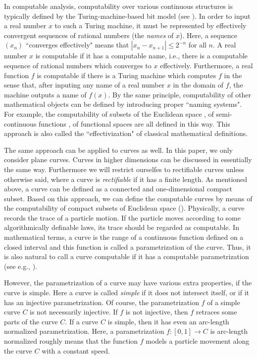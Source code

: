 \documentclass{LMCS}
\theoremstyle{plain}
\begin{document}
In computable analysis, computability over various continuous structures is typically defined by the Turing-machine-based bit model (see \cite{Ko91,Wei00,BC06}). In order to input a real number $x$ to such a Turing machine, it must be represented by effectively convergent sequences of rational numbers (the {\em names} of $x$). Here, a sequence $(x_n)$ ``converges effectively" means that $|x_n-x_{n+1}| \le 2^{-n}$ for all $n$. A real number $x$ is computable if it has a computable name, i.e., there is a computable sequence of rational numbers which converges to $x$ effectively. Furthermore, a real function $f$ is computable if there is a Turing machine which computes $f$ in the sense that, after inputing any name of a real number $x$ in the domain of $f$, the machine outputs a name of $f(x)$. By the same principle, computability of other mathematical objects can be defined by introducing proper ``naming systems". For example, the computability of subsets of the Euclidean space \cite{BW99}, of semi-continuous functions \cite{WZ97}, of functional spaces \cite{ZW03} are all defined in this way. This approach is also called the ``effectivization" of classical mathematical definitions.

The same approach can be applied to curves as well. In this paper, we only consider plane curves. Curves in higher dimensions can be discussed in essentially the same way. Furthermore we will restrict ourselfes to rectifiable curves unless otherwise said, where a curve is {\em rectifiable} if it has a finite length.
As mentioned above, a curve can be defined as a connected and one-dimensional compact subset. Based on this approach, we can define the computable curves by means of the computability of compact subsets of Euclidean space (\cite{BW99}).  Physically, a curve records the trace of a particle motion. If the particle moves according to some algorithmically definable laws, its trace should be regarded as computable. In mathematical terms, a curve is the range of a continuous function defined on a closed interval and this function is called a parametrization of the curve. Thus, it is also natural to call a curve computable if it has a computable parametrization (see e.g.,  \cite{GLM06,GLM11}).

However, the parametrization of a curve may have various extra properties, if the curve is simple. Here a curve is called {\em simple} if it does not intersect itself, or if it has an injective parametrization. Of course, the parametrization $f$ of a simple curve $C$ is not necessarily injective. If $f$ is not injective, then $f$ retraces some parts of the curve $C$. If a curve $C$ is simple, then it has even an arc-length normalized parametrization. Here, a parametrization  $f:[0,1] \to C$ is arc-length normalized roughly means that the function $f$ models a particle movement along the curve $C$ with a constant speed.
\end{document}
